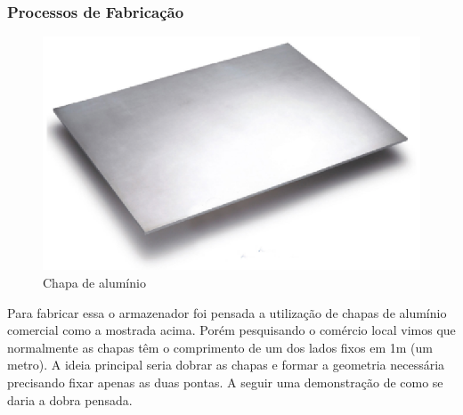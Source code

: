 \subsubsection{Processos de Fabricação}

\begin{figure}[H]
 \centering
   \includegraphics[keepaspectratio=true,scale=0.8]{figuras/estrutura11.eps}
 \caption{Chapa de alumínio}
 \label{chapa_aluminio}
\end{figure}

Para fabricar essa o armazenador foi pensada a utilização de chapas de alumínio comercial como a mostrada acima. Porém pesquisando o comércio local vimos que normalmente as chapas têm o comprimento de um  dos lados fixos em 1m (um metro). A ideia principal seria dobrar as chapas e formar a geometria necessária precisando fixar apenas as duas pontas. A seguir uma demonstração de como se daria a dobra pensada.


